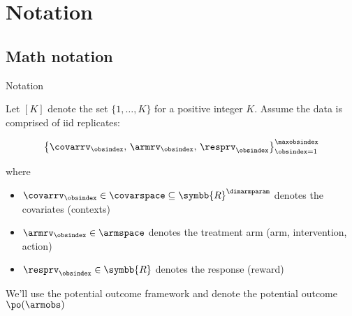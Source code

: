 \documentclass[aspectratio=169, professionalfonts]{beamer}
\begin{document}
\section{Notation}
\subsection{Math notation}
\begin{frame}[label={sec:org00d2d44}]{Notation}

	Let $[K]$ denote the set $\{1, \ldots, K \}$ for a positive integer $K$. Assume
	the data is comprised of iid replicates:

	\begin{equation}
		\left\{{\covarrv}_{\obsindex},\, {\armrv}_{\obsindex},\,
		{\resprv}_{\obsindex} \right\}_{\obsindex = 1}^{\maxobsindex}
	\end{equation}

	where
	\vfill \pause

	\begin{itemize}
		\item $\covarrv_{\obsindex} \in \covarspace \subseteq
			      \symbb{R}^{\dimarmparam}$ denotes the covariates (contexts)

		\item $\armrv_{ \obsindex} \in \armspace$ denotes the treatment arm (arm,
		      intervention, action)

		\item $\resprv_{ \obsindex} \in \symbb{R}$ denotes the response (reward)
	\end{itemize}

	\vfill \pause

	We'll use the potential outcome framework and denote the potential outcome 	$\po(\armobs)$

\end{frame}
\end{document}
